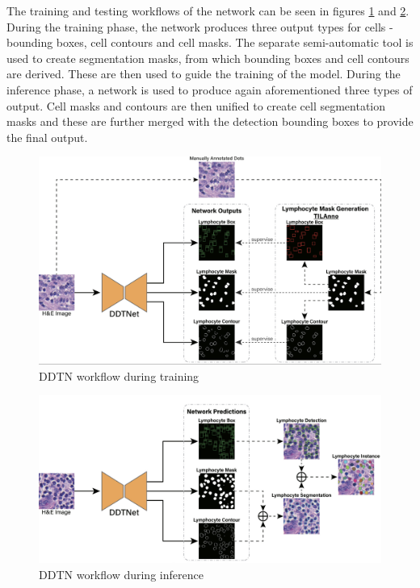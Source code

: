 The training and testing workflows of the network can be seen in figures \ref{fig:rw-ddtn-train} and \ref{fig:rw-ddtn-test}. During the training phase, the network produces three output types for cells - bounding boxes, cell contours and cell masks. The separate semi-automatic tool is used to create segmentation masks, from which bounding boxes and cell contours are derived. These are then used to guide the training of the model. During the inference phase, a network is used to produce again aforementioned three types of output. Cell masks and contours are then unified to create cell segmentation masks and these are further merged with the detection bounding boxes to provide the final output.

\begin{figure}[H]
    \begin{centering}
    \includegraphics[width=12cm]{assets/images/rw-ddtn-train.png}
    \par\end{centering}
    \caption{DDTN workflow during training}
    \label{fig:rw-ddtn-train}
\end{figure}

\begin{figure}[H]
    \begin{centering}
    \includegraphics[width=12cm]{assets/images/rw-ddtn-test.png}
    \par\end{centering}
    \caption{DDTN workflow during inference}
    \label{fig:rw-ddtn-test}
\end{figure}

